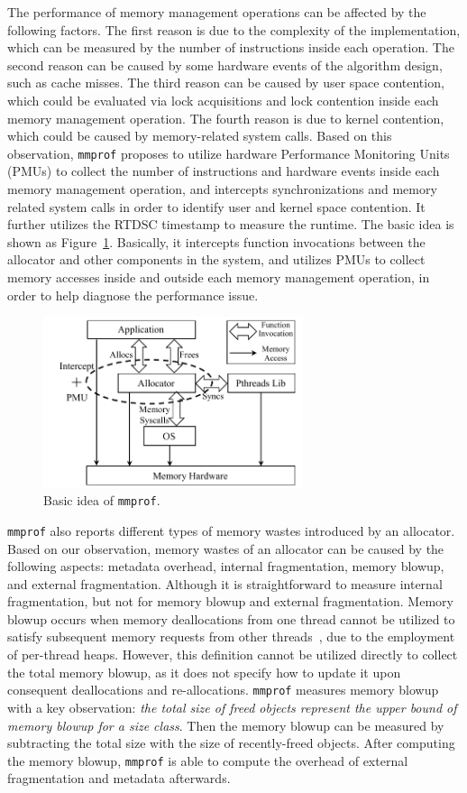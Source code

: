 \documentclass[pageno]{jpaper}
\newcommand{\MP}{\texttt{mmprof}}
\begin{document}
The performance of memory management operations can be affected by the following factors. The first reason is due to the complexity of the implementation, which can be measured by the number of instructions inside each operation. The second reason can be caused by some hardware events of the algorithm design, such as cache misses. The third reason can be caused by user space contention, which could be evaluated via lock acquisitions and lock contention inside each memory management operation. The fourth reason is due to kernel contention, which could be caused by memory-related system calls. Based on this observation, \MP{} proposes to utilize hardware Performance Monitoring Units (PMUs) to collect the number of instructions and hardware events inside each memory management operation, and intercepts synchronizations and memory related system calls in order to identify user and kernel space contention. It further utilizes the RTDSC timestamp to measure the runtime. The basic idea is shown as Figure~\ref{fig:basicidea}. Basically, it intercepts  function invocations between the allocator and other components in the system, and utilizes PMUs to collect memory accesses inside and outside each memory management operation, in order to help diagnose the performance issue. 

\begin{figure}[!ht]
\centering
\includegraphics[width=3in]{figures/basicidea}
\caption{Basic idea of \texttt{mmprof}.\label{fig:basicidea}}
\end{figure}


\MP{} also reports different types of memory wastes introduced by an allocator. Based on our observation, memory wastes of an allocator can be caused by the following aspects: metadata overhead, internal fragmentation, memory blowup, and external fragmentation.  Although it is straightforward to measure internal fragmentation, but not for memory blowup and external fragmentation. Memory blowup occurs when memory deallocations from one thread cannot be utilized to satisfy subsequent memory requests from other threads~\cite{Hoard}, due to the employment of per-thread heaps. However, this definition cannot be utilized directly to collect the total memory blowup, as it does not specify how to update it upon consequent deallocations and re-allocations. \MP{} measures memory blowup with a key observation: \textit{the total size of freed objects represent the upper bound of memory blowup for a size class}. Then the memory blowup can be measured by subtracting the total size with the size of recently-freed objects. After computing the memory blowup, \MP{} is able to compute the overhead of external fragmentation and metadata afterwards. 
 
\end{document}
